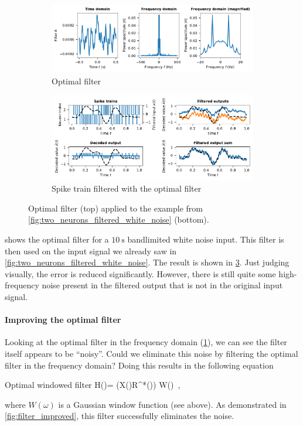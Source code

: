 \documentclass[10pt,letterpaper,oneside]{article}
\begin{document}
\begin{figure}
	\begin{subfigure}{\textwidth}
		\centering
		\includegraphics{media/optimal_filter.pdf}
		\caption{Optimal filter}
		\label{fig:optimal_filter}
	\end{subfigure}
	\begin{subfigure}{\textwidth}
		\centering
		\includegraphics{media/two_neurons_filtered_optimal_simple_small.pdf}
		\caption{Spike train filtered with the optimal filter}
		\label{fig:two_neurons_filtered_optimal_simple_small}
	\end{subfigure}
	\caption{Optimal filter (top) applied to the example from \cref{fig:two_neurons_filtered_white_noise} (bottom). }
\end{figure}

 shows the optimal filter for a $\SI{10}{\second}$ bandlimited white noise input. This filter is then used on the input signal we already saw in \cref{fig:two_neurons_filtered_white_noise}. The result is shown in \cref{fig:two_neurons_filtered_optimal_simple_small}. Just judging visually, the error is reduced significantly. However, there is still quite some high-frequency noise present in the filtered output that is not in the original input signal. 

\paragraph{Improving the optimal filter}
Looking at the optimal filter in the frequency domain (\cref{fig:optimal_filter}), we can see the filter itself appears to be \enquote{noisy}. Could we eliminate this noise by filtering the optimal filter in the frequency domain? Doing this results in the following equation
\begin{ImportantEqn}{Optimal windowed filter}
	H(\omega)= {{(X(\omega)R^*(\omega)) \ast W(\omega)} } \,,
	\label{eqn:optimal_windowed_filter}
\end{ImportantEqn}
where $W(\omega)$ is a Gaussian window function (see above). As demonstrated in \cref{fig:filter_improved}, this filter successfully eliminates the noise.
\end{document}
